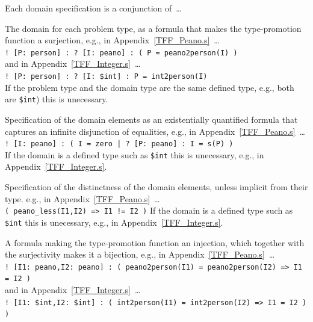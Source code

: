 \documentclass{easychair}
\newcommand{\smalltt}[1]{\small \texttt{#1}}
\newenvironment{packed_itemize}{
\vspace*{-0.3em}
\begin{itemize}
\setlength{\partopsep}{0pt}
\setlength{\itemsep}{1pt}
\setlength{\parskip}{0pt}
\setlength{\parsep}{0pt}
}{\end{itemize}}
\begin{document}
Each domain specification is a conjunction of~\ldots
\begin{packed_itemize}
\item The domain for each problem type, as a formula that makes the type-promotion function a 
      surjection, 
      e.g., in Appendix~\ref{TFF_Peano.s}~\ldots\\
      \hspace*{0.5cm}\smalltt{! [P: person] : ? [I: peano] : ( P = peano2person(I) )}\\
      and in Appendix~\ref{TFF_Integer.s}~\ldots\\
      \hspace*{0.5cm}\smalltt{! [P: person] : ? [I: \$int] : P = int2person(I)}\\
      If the problem type and the domain type are the same defined type, e.g., both are 
      {\tt \$int}) this is unecessary.
\item Specification of the domain elements as an existentially quantified formula that captures an
      infinite disjunction of equalities,
      e.g., in Appendix~\ref{TFF_Peano.s}~\ldots\\
      \hspace*{0.5cm}\smalltt{! [I: peano] : ( I = zero | ? [P: peano] : I = s(P) )} \\
      If the domain is a defined type such as {\tt \$int} this is unecessary,
      e.g., in Appendix~\ref{TFF_Integer.s}.
\item Specification of the distinctness of the domain elements, unless implicit from their type.
      e.g., in Appendix~\ref{TFF_Peano.s}~\ldots\\
      \hspace*{0.5cm}\smalltt{( peano\_less(I1,I2) => I1 != I2 )}
      If the domain is a defined type such as {\tt \$int} this is unecessary,
      e.g., in Appendix~\ref{TFF_Integer.s}.
\item A formula making the type-promotion function an injection, which together with the 
      surjectivity makes it a bijection, 
      e.g., in Appendix~\ref{TFF_Peano.s}~\ldots\\
      \hspace*{0.5cm}\smalltt{! [I1: peano,I2: peano] : ( peano2person(I1) = peano2person(I2) => I1 = I2 )}\\
      and in Appendix~\ref{TFF_Integer.s}~\ldots\\
      \hspace*{0.5cm}\smalltt{! [I1: \$int,I2: \$int] : ( int2person(I1) = int2person(I2) => I1 = I2 ) )}
\end{packed_itemize}
\end{document}
